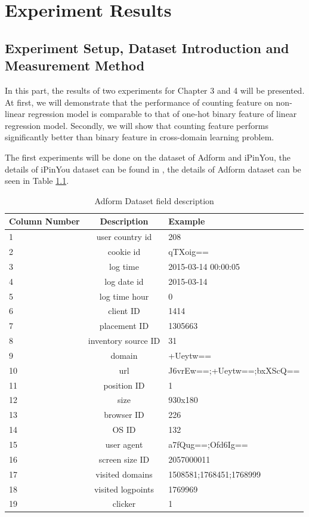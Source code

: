 \chapter{Experiment Results}
\label{chapterlabel7}

\section{Experiment Setup, Dataset Introduction and Measurement Method}

In this part, the results of two experiments for Chapter 3 and 4 will be presented. At first, we will demonstrate that the performance of counting feature on non-linear regression model is comparable to that of one-hot binary feature of linear regression model. Secondly, we will show that counting feature performs significantly better than binary feature in cross-domain learning problem. 

The first experiments will be done on the dataset of Adform and iPinYou, the details of iPinYou dataset can be found in \cite{zhang2014real}, the details of Adform dataset can be seen in Table \ref{tab:triii}.

\begin{table}[h]
\begin{tabular}{l | c | p{5cm}}
Column Number & Description & Example\\
\hline \hline
1 & user country id & 208\\
2 & cookie id & qTXoig== \\
3 & log time & 2015-03-14 00:00:05\\
4 & log date id & 2015-03-14 \\
5 & log time hour & 0\\
6 & client ID & 1414\\
7 & placement ID & 1305663 \\
8 & inventory source ID & 31\\
9 & domain & +Ueytw== \\
10 & url & J6vrEw==;+Ueytw==;bxXScQ==\\
11 & position ID & 1\\
12 & size & 930x180\\
13 & browser ID & 226\\
14 & OS ID & 132\\
15 & user agent & a7fQug==;Ofd6Ig==\\
16 & screen size ID & 2057000011\\
17 & visited domains & 1508581;1768451;1768999\\
18 & visited logpoints & 1769969 \\
19 & clicker& 1 \\
\end{tabular}
\caption{Adform Dataset field description}
\label{tab:triii}
\end{table}

